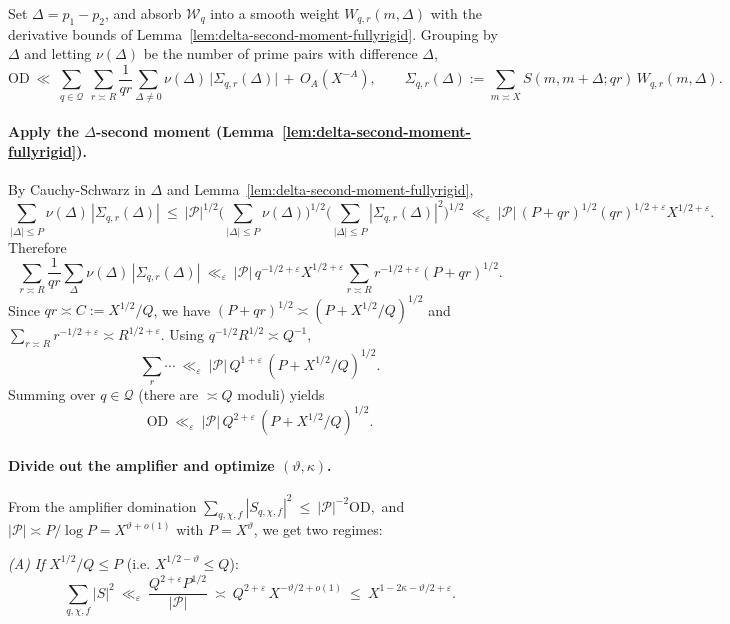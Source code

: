 \documentclass[11pt]{article}
\theoremstyle{definition}
\theoremstyle{remark}
\numberwithin{equation}{part}
\begin{document}
Set $\Delta=p_1-p_2$, and absorb $\mathcal W_q$ into a smooth weight $W_{q,r}(m,\Delta)$ with the derivative bounds of Lemma~\ref{lem:delta-second-moment-fullyrigid}. Grouping by $\Delta$ and letting $\nu(\Delta)$ be the number of prime pairs with difference $\Delta$,
\[
	\mathrm{OD}\ \ll\ \sum_{q\in\mathcal Q}\ \sum_{r\asymp R}\frac{1}{qr}\sum_{\Delta\ne 0}\nu(\Delta)\,
	\Big|\Sigma_{q,r}(\Delta)\Big| \,+\, O_A(X^{-A}),\qquad
	\Sigma_{q,r}(\Delta):=\sum_{m\asymp X} S(m,m+\Delta;qr)\,W_{q,r}(m,\Delta).
\]

\paragraph{Apply the $\Delta$-second moment (Lemma~\ref{lem:delta-second-moment-fullyrigid}).}
By Cauchy-Schwarz in $\Delta$ and Lemma~\ref{lem:delta-second-moment-fullyrigid},
\[
	\sum_{|\Delta|\le P}\nu(\Delta)\,|\Sigma_{q,r}(\Delta)|
	\ \le\ |\mathcal P|^{1/2}\Big(\sum_{|\Delta|\le P}\nu(\Delta)\Big)^{1/2}
	\Big(\sum_{|\Delta|\le P}|\Sigma_{q,r}(\Delta)|^2\Big)^{1/2}
	\ \ll_\varepsilon\ |\mathcal P|\,(P+qr)^{1/2}(qr)^{1/2+\varepsilon}X^{1/2+\varepsilon}.
\]
Therefore
\[
	\sum_{r\asymp R}\frac{1}{qr}\sum_{\Delta}\nu(\Delta)\,|\Sigma_{q,r}(\Delta)|
	\ \ll_\varepsilon\ |\mathcal P|\,q^{-1/2+\varepsilon}X^{1/2+\varepsilon}\!\!\sum_{r\asymp R} r^{-1/2+\varepsilon}(P+qr)^{1/2}.
\]
Since $qr\asymp C:=X^{1/2}/Q$, we have $(P+qr)^{1/2}\asymp (P+X^{1/2}/Q)^{1/2}$ and $\sum_{r\asymp R} r^{-1/2+\varepsilon}\asymp R^{1/2+\varepsilon}$. Using $q^{-1/2}R^{1/2}\asymp Q^{-1}$,
\[
	\sum_{r}\cdots\ \ll_\varepsilon\ |\mathcal P|\,Q^{1+\varepsilon}\,(P+X^{1/2}/Q)^{1/2}.
\]
Summing over $q\in\mathcal Q$ (there are $\asymp Q$ moduli) yields
\begin{equation}\label{eq:OD-final}
	\mathrm{OD}\ \ll_\varepsilon\ |\mathcal P|\,Q^{2+\varepsilon}\,(P+X^{1/2}/Q)^{1/2}.
\end{equation}

\paragraph{Divide out the amplifier and optimize $(\vartheta,\kappa)$.}
From the amplifier domination
\(
\sum_{q,\chi,f}|S_{q,\chi,f}|^2\ \le\ |\mathcal P|^{-2}\mathrm{OD},
\)
and $|\mathcal P|\asymp P/\log P=X^{\vartheta+o(1)}$ with $P=X^\vartheta$, we get two regimes:

\smallskip
\noindent\emph{(A) If } $X^{1/2}/Q\le P$ (i.e. $X^{1/2-\vartheta}\le Q$):
\[
	\sum_{q,\chi,f}|S|^2\ \ll_\varepsilon\ \frac{Q^{2+\varepsilon}P^{1/2}}{|\mathcal P|}\ \asymp\ Q^{2+\varepsilon}\,X^{-\vartheta/2+o(1)}
	\ \le\ X^{1-2\kappa-\vartheta/2+\varepsilon}.
\]
\end{document}
